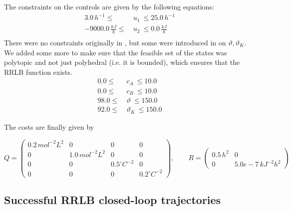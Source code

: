 \documentclass[12pt]{article}
\begin{document}
\noindent The constraints on the controls are given by the following equations:
\begin{align*}
	3.0\,h^{-1}\leq &~u_1~ \leq 25.0\,h^{-1}\\
	-9000.0\,\frac{kJ}{h}\leq &~u_2~ \leq 0.0\,\frac{kJ}{h}\\
\end{align*}
There were no constraints originally in \cite{diehl-dissertation}, but some were introduced in \cite{cstr-ref} on $\vartheta,\vartheta_K$.
We added some more to make sure that the feasible set of the states was polytopic and not just polyhedral (i.e. it is bounded), which ensures that the RRLB function exists.
\begin{align*}
	0.0\leq&~c_A~\leq 10.0\\
	0.0\leq&~c_B~\leq 10.0\\
	98.0\leq &~\vartheta~\leq 150.0\\
	92.0\leq &~\vartheta_K~\leq 150.0
\end{align*}

\noindent The costs are finally given by

$$Q=\begin{pmatrix}
	0.2\,mol^{-2}L^2 & 0 & 0 & 0\\
	0 & 1.0\,mol^{-2}L^2 & 0 & 0\\
	0 & 0 & 0.5^\circ C^{-2} & 0\\
	0 & 0 & 0 & 0.2^\circ C^{-2}
\end{pmatrix},\qquad R=\begin{pmatrix}
	0.5\,h^{2} & 0\\
	0 & 5.0e-7\,kJ^{-2}h^2
\end{pmatrix}$$

\subsection*{Successful RRLB closed-loop trajectories}
\end{document}
